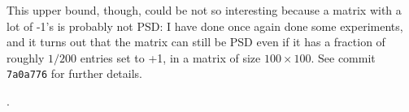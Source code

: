 This upper bound, though, could be not so interesting because a matrix with a lot of -1's is probably not PSD: I have done once again done some experiments, and it turns out that the matrix can still be PSD even if it has a fraction of roughly $1/200$ entries set to +1, in a matrix of size $100\times 100$. See commit \texttt{7a0a776} for further details.

.